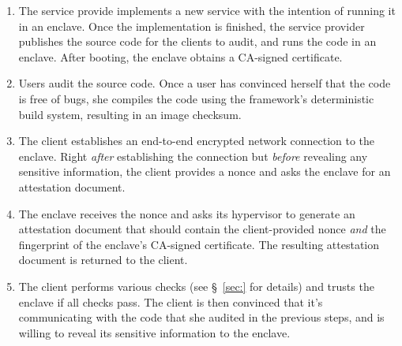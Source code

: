 \begin{enumerate}
    \item The service provide implements a new service with the intention of running it in an enclave.  Once the implementation is finished, the service provider publishes the source code for the clients to audit, and runs the code in an enclave.  After booting, the enclave obtains a CA-signed certificate.
    \item Users audit the source code.  Once a user has convinced herself that the code is free of bugs, she compiles the code using the framework's deterministic build system, resulting in an image checksum.
    \item The client establishes an end-to-end encrypted network connection to the enclave.  Right \emph{after} establishing the connection but \emph{before} revealing any sensitive information, the client provides a nonce and asks the enclave for an attestation document.
    \item The enclave receives the nonce and asks its hypervisor to generate an attestation document that should contain the client-provided nonce \emph{and} the fingerprint of the enclave's CA-signed certificate.  The resulting attestation document is returned to the client.
    \item The client performs various checks (see \S~\ref{sec:} for details) and trusts the enclave if all checks pass.  The client is then convinced that it's communicating with the code that she audited in the previous steps, and is willing to reveal its sensitive information to the enclave.
\end{enumerate}



